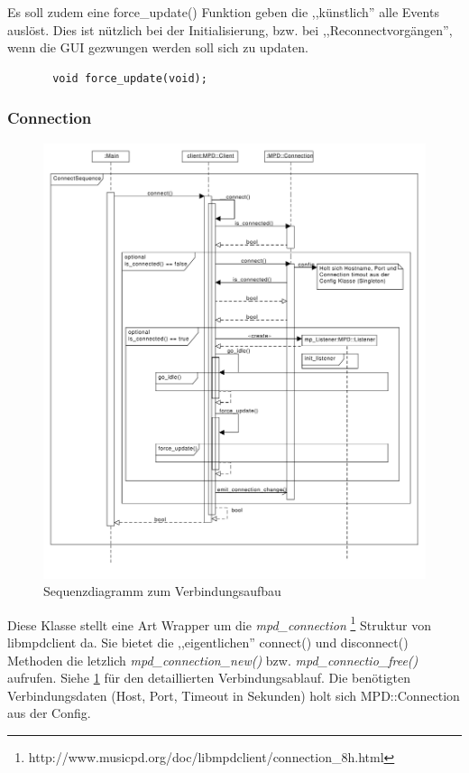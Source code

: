 Es soll zudem eine force\_update() Funktion geben die ,,künstlich'' alle Events auslöst.
Dies ist nützlich bei der Initialisierung, bzw. bei ,,Reconnectvorgängen'', wenn die GUI gezwungen werden
soll sich zu updaten.
\begin{verbatim}
       void force_update(void);
\end{verbatim}

\subsubsection{Connection}
\begin{figure}[htb!]
	\centering
        \includegraphics[scale=0.5]{ConnectSequence.pdf}
	\caption{Sequenzdiagramm zum Verbindungsaufbau}
	\label{seq_client_connect}
\end{figure}
Diese Klasse stellt eine Art Wrapper um die \textit{mpd\_connection}
\footnote{http://www.musicpd.org/doc/libmpdclient/connection\_8h.html} Struktur von libmpdclient da.
Sie bietet die ,,eigentlichen'' connect() und disconnect() Methoden die letzlich \textit{mpd\_connection\_new()} bzw. \textit{mpd\_connectio\_free()} aufrufen. Siehe \ref{seq_client_connect} für den detaillierten Verbindungsablauf. Die benötigten Verbindungsdaten (Host, Port, Timeout in Sekunden) holt sich MPD::Connection aus der Config.
